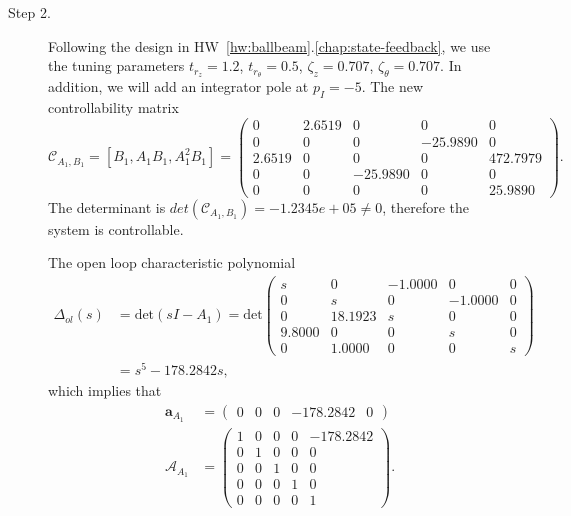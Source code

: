 \begin{description}
\item[Step 2.] 
Following the design in HW~\ref{hw:ballbeam}.\ref{chap:state-feedback}, we use the tuning parameters $t_{r_z} = 1.2$, $t_{r_\theta} = 0.5$, $\zeta_z = 0.707$, $\zeta_\theta  = 0.707$. In addition, we will add an integrator pole at $p_I = -5$.
The new controllability matrix
\[
\mathcal{C}_{A_1,B_1} = [B_1, A_1B_1, A_1^2B_1] = \begin{pmatrix} 
         0 &   2.6519 &        0 &        0 &        0 \\
         0 &        0 &        0 & -25.9890 &        0 \\
    2.6519 &        0 &        0 &        0 & 472.7979 \\
         0 &        0 & -25.9890 &        0 &        0 \\
         0 &        0 &        0 &        0 &  25.9890
\end{pmatrix}.
\]
The determinant is $det(\mathcal{C}_{A_1,B_1})=-1.2345e+05\neq 0$, therefore the system is controllable.  

The open loop characteristic polynomial
\begin{align*}
\Delta_{ol}(s)&=\text{det}(sI-A_1) = \text{det}\begin{pmatrix} 
         s &        0 &   -1.0000 &        0 &        0 \\
         0 &        s &        0 &   -1.0000 &        0 \\
         0 & 18.1923 &        s &        0 &        0 \\
   9.8000 &        0 &        0 &        s &        0 \\
         0 &  1.0000 &        0 &        0 &        s
\end{pmatrix} \\ &= s^5 -178.2842s,
\end{align*}
which implies that
\begin{align*}
\mathbf{a}_{A_1} &= \begin{pmatrix}
0 &        0 &        0 & -178.2842 &        0
\end{pmatrix} \\
\mathcal{A}_{A_1} &= \begin{pmatrix} 
1 & 0 & 0 & 0 & -178.2842 \\
0 & 1 & 0 & 0 & 0 \\
0 & 0 & 1 & 0 & 0 \\
0 & 0 & 0 & 1 & 0 \\
0 & 0 & 0 & 0 & 1
\end{pmatrix}.
\end{align*}


\end{description}
